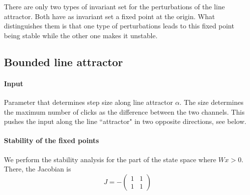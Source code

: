 \documentclass{article} %
\newcounter{ct}
\newcommand{\win}{\vW_{\text{in}}}
\newcommand{\wout}{\vW_{\text{out}}}
\newcommand{\bout}{\vb_{\text{out}}}
\theoremstyle{definition}
\theoremstyle{remark}
\begin{document}
There are only two types of invariant set for the perturbations of the line attractor. Both have as invariant set a fixed point at the origin. What distinguishes them is that one type of perturbations leads to this fixed point being stable while the other one makes it unstable.



\subsection{Bounded line attractor}\label{sec:supp:bla}

\paragraph{Input}
Parameter that determines step size along line attractor $\alpha$.
The size determines the maximum number of clicks as the difference between the two channels. 
This pushes the input along the line ``attractor" in two opposite directions, %
see below.

%



\paragraph{Stability of the fixed points}
We perform the stability analysis for the part of the state space where $Wx>0$.
There, the Jacobian is
\begin{equation}
J = -
\begin{pmatrix}
1  &  1 \\
1  &  1
\end{pmatrix}
\end{equation}
\end{document}
